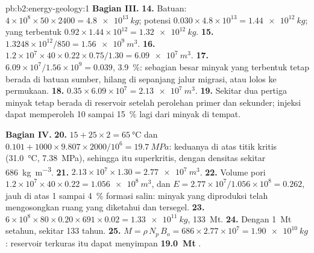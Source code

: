 \begin{solution}{pb:b2:energy-geology:1}
\noindent\textbf{Bagian III.}
\textbf{14.} Batuan: $4 \times 10^8 \times 50 \times 2400 = \qty{4.8e13}{kg}$; potensi $0.030
\times 4.8 \times 10^{13} = \qty{1.44e12}{kg}$; yang terbentuk $0.92 \times 1.44 \times 10^{12} =
\qty{1.32e12}{kg}$.
\textbf{15.} $1.3248 \times 10^{12}/850 = \qty{1.56e9}{m^3}$.
\textbf{16.} $1.2 \times 10^7 \times 40 \times 0.22 \times 0.75/1.30 = \qty{6.09e7}{m^3}$.
\textbf{17.} $6.09 \times 10^7/1.56 \times 10^9 = 0.039$, \qty{3.9}{\percent}: sebagian besar minyak yang terbentuk
tetap berada di batuan sumber, hilang di sepanjang jalur migrasi, atau lolos ke permukaan.
\textbf{18.} $0.35 \times 6.09 \times 10^7 = \qty{2.13e7}{m^3}$.
\textbf{19.} Sekitar dua pertiga minyak tetap berada di reservoir setelah perolehan primer dan
sekunder; injeksi  dapat memperoleh 10 sampai \qty{15}{\percent} lagi dari minyak di tempat.

\noindent\textbf{Bagian IV.}
\textbf{20.} $15 + 25 \times 2 = \qty{65}{\celsius}$ dan $0.101 + 1000 \times 9.807 \times 2000/10^6
= \qty{19.7}{MPa}$: keduanya di atas titik kritis (\qty{31.0}{\celsius}, \qty{7.38}{MPa}), sehingga
 itu superkritis, dengan densitas sekitar \qty{686}{kg.m^{-3}}.
\textbf{21.} $2.13 \times 10^7 \times 1.30 = \qty{2.77e7}{m^3}$.
\textbf{22.} Volume pori $1.2 \times 10^7 \times 40 \times 0.22 = \qty{1.056e8}{m^3}$, dan $E =
2.77 \times 10^7/1.056 \times 10^8 = 0.262$, jauh di atas 1 sampai \qty{4}{\percent} formasi
salin: minyak yang diproduksi telah mengosongkan ruang yang diketahui dan tersegel.
\textbf{23.} $6 \times 10^8 \times 80 \times 0.20 \times 691 \times 0.02 = \qty{1.33e11}{kg}$,
\qty{133}{Mt}.
\textbf{24.} Dengan \qty{1}{Mt} setahun, sekitar 133 tahun.
\textbf{25.} $M = \rho\,N_p\,B_o = 686 \times 2.77 \times 10^7 = \qty{1.90e10}{kg}$: reservoir terkuras
itu dapat menyimpan \textbf{\qty[text-series-to-math=true]{19.0}{Mt}} .
\end{solution}
